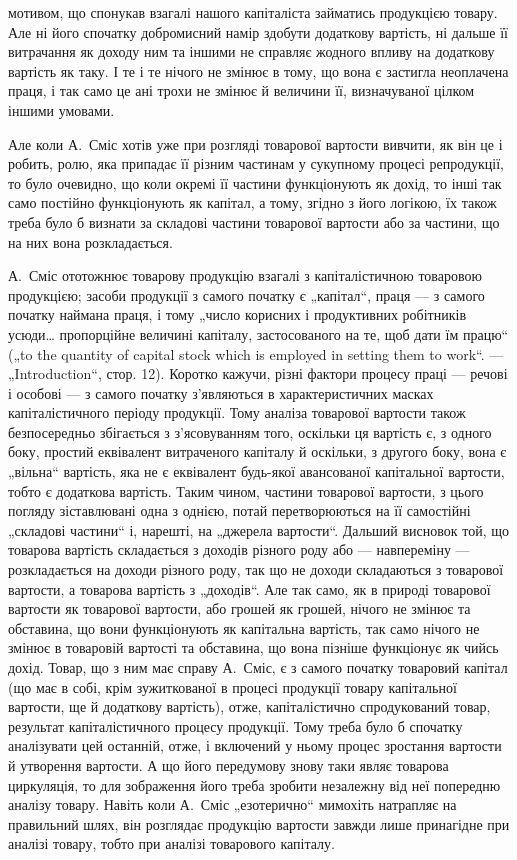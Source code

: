 \parcont{}  %
мотивом, що спонукав взагалі нашого капіталіста займатись продукцією
товару. Але ні його спочатку добромисний намір здобути додаткову
вартість, ні дальше її витрачання як доходу ним та іншими не справляє
жодного впливу на додаткову вартість як таку. І те і те нічого не змінює
в тому, що вона є застигла неоплачена праця, і так само це ані
трохи не змінює й величини її, визначуваної цілком іншими умовами.

Але коли А.~Сміс хотів уже при розгляді товарової вартости вивчити,
як він це і робить, ролю, яка припадає її різним частинам у сукупному
процесі репродукції, то було очевидно, що коли окремі її частини
функціонують як дохід, то інші так само постійно функціонують як капітал,
а тому, згідно з його логікою, їх також треба було б визнати за
складові частини товарової вартости або за частини, що на них вона
розкладається.

А.~Сміс ототожнює товарову продукцію взагалі з капіталістичною
товаровою продукцією; засоби продукції з самого початку є „капітал“,
праця — з самого початку наймана праця, і тому „число корисних і продуктивних
робітників усюди\dots{} пропорційне величині капіталу, застосованого
на те, щоб дати їм працю“ („to the quantity of capital stock which
is employed in setting them to work“. — „Introduction“, стор. 12). Коротко
кажучи, різні фактори процесу праці — речові і особові — з самого початку
з’являються в характеристичних масках капіталістичного періоду
продукції. Тому аналіза товарової вартости також безпосередньо збігається
з з’ясовуванням того, оскільки ця вартість є, з одного боку, простий
еквівалент витраченого капіталу й оскільки, з другого боку, вона є
„вільна“ вартість, яка не є еквівалент будь-якої авансованої капітальної
вартости, тобто є додаткова вартість. Таким чином, частини товарової
вартости, з цього погляду зіставлювані одна з однією, потай перетворюються
на її самостійні „складові частини“ і, нарешті, на „джерела вартости“.
Дальший висновок той, що товарова вартість складається з доходів
різного роду або — навпереміну — розкладається на доходи різного
роду, так що не доходи складаються з товарової вартости, а товарова
вартість з „доходів“. Але так само, як в природі товарової вартости як
товарової вартости, або грошей як грошей, нічого не змінює та обставина,
що вони функціонують як капітальна вартість, так само нічого не
змінює в товаровій вартості та обставина, що вона пізніше функціонує
як чийсь дохід. Товар, що з ним має справу А.~Сміс, є з самого початку
товаровий капітал (що має в собі, крім зужиткованої в процесі продукції
товару капітальної вартости, ще й додаткову вартість), отже, капіталістично
спродукований товар, результат капіталістичного процесу
продукції. Тому треба було б спочатку аналізувати цей останній, отже,
і включений у ньому процес зростання вартости й утворення вартости.
А що його передумову знову таки являє товарова циркуляція, то для
зображення його треба зробити незалежну від неї попередню аналізу
товару. Навіть коли А.~Сміс „езотерично“ мимохіть натрапляє на правильний
шлях, він розглядає продукцію вартости завжди лише принагідне
при аналізі товару, тобто при аналізі товарового капіталу.
\label{original-298}